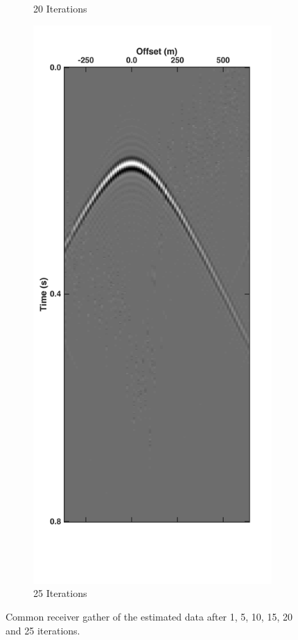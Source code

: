 \begin{figure}
\begin{subfigure}[t]{0.25\textwidth}
		\caption{20 Iterations}
		\label{fig:Ch-Theory-DeblendedCRG20}
	\end{subfigure}
	\begin{subfigure}[t]{0.25\textwidth}
		\includegraphics[width=\textwidth]{Plots/Mahdad/25iter/DeblendedCRG_rec30}	
		\caption{25 Iterations}
		\label{fig:Ch-Theory-DeblendedCRG25}
	\end{subfigure}
	\caption{Common receiver gather of the estimated data after 1, 5, 10, 15, 20 and 25 iterations.}
	\label{fig:Ch-Theory-EstimatedData}

\end{figure}

\FloatBarrier


